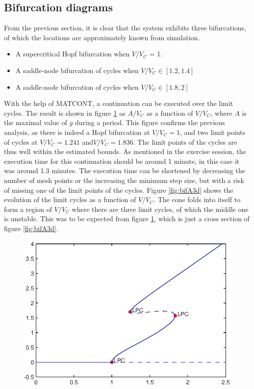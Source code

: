 \subsection{Bifurcation diagrams}
From the previous section, it is clear that the system exhibits three bifurcations, of which the locations are approximately known from simulation.
\begin{itemize}
\item A supercritical Hopf bifurcation when $V/V_C$ = 1.
\item A saddle-node bifurcation of cycles when $V/V_C\in[1.2,1.4]$
\item A saddle-node bifurcation of cycles when $V/V_C\in[1.8,2]$
\end{itemize}
With the help of MATCONT, a continuation can be executed over the limit cycles. The result is shown in figure \ref{fig:ex2bifecht} as $A/V_C$ as a function of $V/V_C$, where $A$ is the maximal value of $y$ during a period. This figure confirms the previous analysis, as there is indeed a Hopf bifurcation at $V/V_C=1$, and two limit points of cycles at $V/V_C=1.241$ and$V/V_C=1.836$. The limit points of the cycles are thus well within the estimated bounds.
\newline
\newline As mentioned in the exercise session, the execution time for this continuation should be around 1 minute, in this case it was around 1.3 minutes. The execution time can be shortened by decreasing the number of mesh points or the increasing the minimum step size, but with a risk of missing one of the limit points of the cycles. Figure \ref{fig:bifA3d} shows the evolution of the limit cycles as a function of $V/V_C$. The cone folds into itself to form a region of $V/V_C$ where there are three limit cycles, of which the middle one is unstable. This was to be expected from figure \ref{fig:ex2bifecht}, which is just a cross section of figure \ref{fig:bifA3d}.
\begin{figure}[htp]
\centering
\includegraphics{img/ex2/bifA.eps}
\caption{}
\label{fig:ex2bifecht}
\end{figure}
